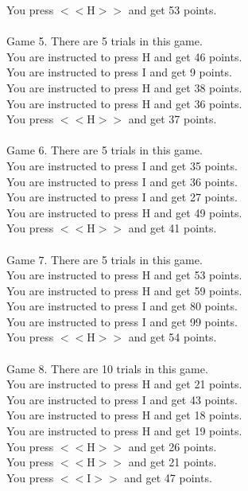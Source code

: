 \documentclass[pdflatex,sn-nature]{sn-jnl}%
\theoremstyle{thmstyleone}%
\theoremstyle{thmstyletwo}%
\theoremstyle{thmstylethree}%
\begin{document}
You press $<<$H$>>$ and get 53 points. $~$\\ 
 $~$\\ 
Game 5. There are 5 trials in this game. $~$\\ 
You are instructed to press H and get 46 points. $~$\\ 
You are instructed to press I and get 9 points. $~$\\ 
You are instructed to press H and get 38 points. $~$\\ 
You are instructed to press H and get 36 points. $~$\\ 
You press $<<$H$>>$ and get 37 points. $~$\\ 
 $~$\\ 
Game 6. There are 5 trials in this game. $~$\\ 
You are instructed to press I and get 35 points. $~$\\ 
You are instructed to press I and get 36 points. $~$\\ 
You are instructed to press I and get 27 points. $~$\\ 
You are instructed to press H and get 49 points. $~$\\ 
You press $<<$H$>>$ and get 41 points. $~$\\ 
 $~$\\ 
Game 7. There are 5 trials in this game. $~$\\ 
You are instructed to press H and get 53 points. $~$\\ 
You are instructed to press H and get 59 points. $~$\\ 
You are instructed to press I and get 80 points. $~$\\ 
You are instructed to press I and get 99 points. $~$\\ 
You press $<<$H$>>$ and get 54 points. $~$\\ 
 $~$\\ 
Game 8. There are 10 trials in this game. $~$\\ 
You are instructed to press H and get 21 points. $~$\\ 
You are instructed to press I and get 43 points. $~$\\ 
You are instructed to press H and get 18 points. $~$\\ 
You are instructed to press H and get 19 points. $~$\\ 
You press $<<$H$>>$ and get 26 points. $~$\\ 
You press $<<$H$>>$ and get 21 points. $~$\\ 
You press $<<$I$>>$ and get 47 points. $~$\\ 
\end{document}
